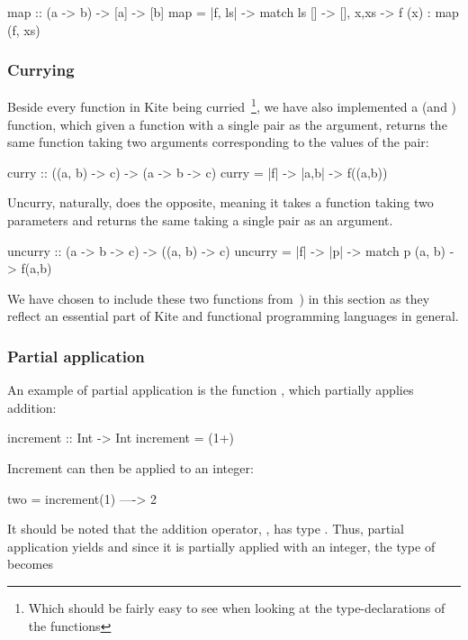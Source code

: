\begin{kite}
map :: (a -> b) -> [a] -> [b]
map = |f, ls| -> {
  match ls {
    [] -> [],
    x,xs -> f (x) : map (f, xs)
  }
}
\end{kite}

\subsubsection{Currying}
\label{subsubsec:currying}
Beside every function in Kite being curried~\footnote{Which should be fairly easy to see when looking at the type-declarations of the functions}, we have also implemented a  (and ) function, which given a function with a single pair as the argument, returns the same function taking two arguments corresponding to the values of the pair:

\begin{kite}
curry :: ((a, b) -> c) -> (a -> b -> c)
curry = |f| -> {
  |a,b| -> {
    f((a,b))
  }
}
\end{kite}

Uncurry, naturally, does the opposite, meaning it takes a function taking two parameters and returns the same taking a single pair as an argument.

\begin{kite}
uncurry :: (a -> b -> c) -> ((a, b) -> c)
uncurry = |f| -> {
  |p| -> {
    match p {
      (a, b) -> f(a,b)
    }
  }
}
\end{kite}

We have chosen to include these two functions from~) in this section as they reflect an essential part of Kite and functional programming languages in general.

\subsubsection{Partial application}
An example of partial application is the function , which partially applies addition:

\begin{kite}
increment :: Int -> Int
increment = (1+)
\end{kite}

Increment can then be applied to an integer:

\begin{kite}
two = increment(1) ----> 2
\end{kite}

It should be noted that the addition operator, \code{+}, has type . Thus, partial application yields  and since
it is partially applied with an integer, the type of 
becomes 

